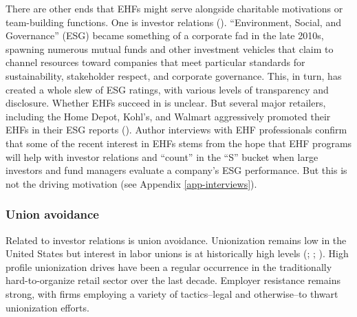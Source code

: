 \documentclass[
  11pt,
  oneside]{article}
\begin{document}
There are other ends that EHFs might serve alongside charitable motivations or team-building functions. One is investor relations (). ``Environment, Social, and Governance'' (ESG) became something of a corporate fad in the late 2010s, spawning numerous mutual funds and other investment vehicles that claim to channel resources toward companies that meet particular standards for sustainability, stakeholder respect, and corporate governance. This, in turn, has created a whole slew of ESG ratings, with various levels of transparency and disclosure. Whether EHFs succeed in is unclear. But several major retailers, including the Home Depot, Kohl's, and Walmart aggressively promoted their EHFs in their ESG reports (). Author interviews with EHF professionals confirm that some of the recent interest in EHFs stems from the hope that EHF programs will help with investor relations and ``count'' in the ``S'' bucket when large investors and fund managers evaluate a company's ESG performance. But this is not the driving motivation (see Appendix \ref{app-interviews}).

\subsubsection{Union avoidance}\label{union-avoidance}

Related to investor relations is union avoidance. Unionization remains low in the United States but interest in labor unions is at historically high levels (; ; ). High profile unionization drives have been a regular occurrence in the traditionally hard-to-organize retail sector over the last decade. Employer resistance remains strong, with firms employing a variety of tactics--legal and otherwise--to thwart unionization efforts.
\end{document}
